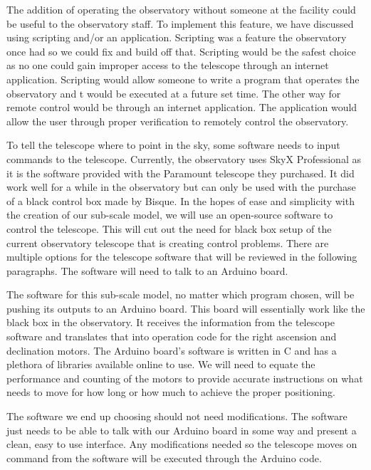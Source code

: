 \documentclass[12pt]{report}
\begin{document}
The addition of operating the observatory without someone at the facility could be useful to the observatory staff. To implement this feature, we have discussed using scripting and/or an application. Scripting was a feature the observatory once had so we could fix and build off that. Scripting would be the safest choice as no one could gain improper access to the telescope through an internet application. Scripting would allow someone to write a program that operates the observatory and t would be executed at a future set time. The other way for remote control would be through an internet application. The application would allow the user through proper verification to remotely control the observatory.

To tell the telescope where to point in the sky, some software needs to input commands to the telescope. Currently, the observatory uses SkyX Professional as it is the software provided with the Paramount telescope they purchased. It did work well for a while in the observatory but can only be used with the purchase of a black control box made by Bisque. In the hopes of ease and simplicity with the creation of our sub-scale model, we will use an open-source software to control the telescope. This will cut out the need for black box setup of the current observatory telescope that is creating control problems. There are multiple options for the telescope software that will be reviewed in the following paragraphs. The software will need to talk to an Arduino board.

The software for this sub-scale model, no matter which program chosen, will be pushing its outputs to an Arduino board. This board will essentially work like the black box in the observatory. It receives the information from the telescope software and translates that into operation code for the right ascension and declination motors. The Arduino board's software is written in C and has a plethora of libraries available online to use. We will need to equate the performance and counting of the motors to provide accurate instructions on what needs to move for how long or how much to achieve the proper positioning.

The software we end up choosing should not need modifications. The software just needs to be able to talk with our Arduino board in some way and present a clean, easy to use interface. Any modifications needed so the telescope moves on command from the software will be executed through the Arduino code.

\newpage %
\end{document}
